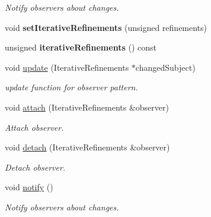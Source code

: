 \begin{DoxyCompactItemize}
\begin{DoxyCompactList}\small\item\em Notify observers about changes. \end{DoxyCompactList}\item 
\hypertarget{classSpacy_1_1Mixin_1_1IterativeRefinements_afd8815d6932a99b1700f54162d9f633e}{}void {\bfseries set\+Iterative\+Refinements} (unsigned refinements)\label{classSpacy_1_1Mixin_1_1IterativeRefinements_afd8815d6932a99b1700f54162d9f633e}

\item 
\hypertarget{classSpacy_1_1Mixin_1_1IterativeRefinements_a560cd9428928c941765b71dd7c51ae3b}{}unsigned {\bfseries iterative\+Refinements} () const \label{classSpacy_1_1Mixin_1_1IterativeRefinements_a560cd9428928c941765b71dd7c51ae3b}

\item 
\hypertarget{classSpacy_1_1Mixin_1_1IterativeRefinements_adcb6062728331e48515a05f539628062}{}void \hyperlink{classSpacy_1_1Mixin_1_1IterativeRefinements_adcb6062728331e48515a05f539628062}{update} (Iterative\+Refinements $\ast$changed\+Subject)\label{classSpacy_1_1Mixin_1_1IterativeRefinements_adcb6062728331e48515a05f539628062}

\begin{DoxyCompactList}\small\item\em update function for observer pattern. \end{DoxyCompactList}\item 
\hypertarget{classSpacy_1_1Mixin_1_1MixinConnection_abb5520ee6b22dd993d78f142939a1ed4}{}void \hyperlink{classSpacy_1_1Mixin_1_1MixinConnection_abb5520ee6b22dd993d78f142939a1ed4}{attach} (Iterative\+Refinements \&observer)\label{classSpacy_1_1Mixin_1_1MixinConnection_abb5520ee6b22dd993d78f142939a1ed4}

\begin{DoxyCompactList}\small\item\em Attach observer. \end{DoxyCompactList}\item 
\hypertarget{classSpacy_1_1Mixin_1_1MixinConnection_adda739590c487679c26f60e50aedb73f}{}void \hyperlink{classSpacy_1_1Mixin_1_1MixinConnection_adda739590c487679c26f60e50aedb73f}{detach} (Iterative\+Refinements \&observer)\label{classSpacy_1_1Mixin_1_1MixinConnection_adda739590c487679c26f60e50aedb73f}

\begin{DoxyCompactList}\small\item\em Detach observer. \end{DoxyCompactList}\item 
\hypertarget{classSpacy_1_1Mixin_1_1MixinConnection_a1ddeaa78a3bb4a38c2cca36d1f99fe36}{}void \hyperlink{classSpacy_1_1Mixin_1_1MixinConnection_a1ddeaa78a3bb4a38c2cca36d1f99fe36}{notify} ()\label{classSpacy_1_1Mixin_1_1MixinConnection_a1ddeaa78a3bb4a38c2cca36d1f99fe36}

\begin{DoxyCompactList}\small\item\em Notify observers about changes. \end{DoxyCompactList}\end{DoxyCompactItemize}


